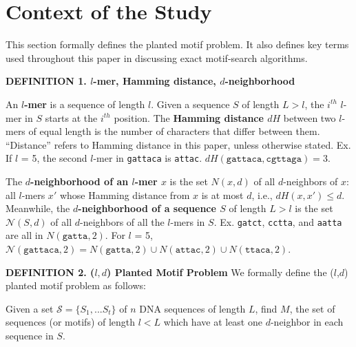 \documentclass[oneside,12pt]{DISCSthesis}
\begin{document}
	\section{Context of the Study}
		This section formally defines the planted motif problem. It also defines key terms used throughout this paper in discussing exact motif-search algorithms.

		\noindent\textbf{\boldmath DEFINITION 1. $l$-mer, Hamming distance, $d$-neighborhood}

		\noindent An \textbf{\boldmath $l$-mer} is a sequence of length $l$. Given a sequence $S$ of length $L > l$, the $i^{th}$ $l$-mer in $S$ starts at the $i^{th}$ position. The \textbf{\boldmath Hamming distance $dH$} between two $l$-mers of equal length is the number of characters that differ between them. ``Distance'' refers to Hamming distance in this paper, unless otherwise stated.
		\newline\hspace*{35pt} Ex. If $l$ = 5, the second $l$-mer in \texttt{gattaca} is \texttt{attac}.
		\newline\hspace*{55pt} $dH(\texttt{gattaca}, \texttt{cgttaga}) = 3$.

		\noindent The \textbf{\boldmath $d$-neighborhood of an $l$-mer $x$} is the set {\boldmath $N(x, d)$} of all $d$-neighbors of $x$: all $l$-mers $x'$ whose Hamming distance from $x$ is at most $d$, i.e., {\boldmath $dH (x, x') \leq d$}. 
		Meanwhile, the \textbf{\boldmath $d$-neighborhood of a sequence $S$} of length $L > l$ is the set {\boldmath $\mathcal{N}(S, d)$} of all $d$-neighbors of all the $l$-mers in $S$.
		\newline\hspace*{35pt} Ex. \texttt{gatct}, \texttt{cctta}, and \texttt{aatta} are all in $N(\texttt{gatta}, 2)$.
		\newline\hspace*{55pt} For $l$ = 5,
			$\mathcal{N}(\texttt{gattaca}, 2) 
					= N(\texttt{gatta}, 2) \cup 
						N(\texttt{attac}, 2) \cup
						N(\texttt{ttaca}, 2)$.\newline
		
		\noindent\textbf{\boldmath DEFINITION 2. ($l,d$) Planted Motif Problem}
		\newline We formally define the ($l$,$d$) planted motif problem as follows:\bigskip

		\noindent\hspace*{50pt} Given a set $\mathcal{S} = \{S_{1},...S_{t}\}$ of $n$ DNA sequences of length $L$,
		\newline \hspace*{50pt} find $M$, the set of sequences (or motifs) of length $l < L$
		\newline \hspace*{50pt} which have at least one $d$-neighbor in each sequence in $S$. %
		
\end{document}
